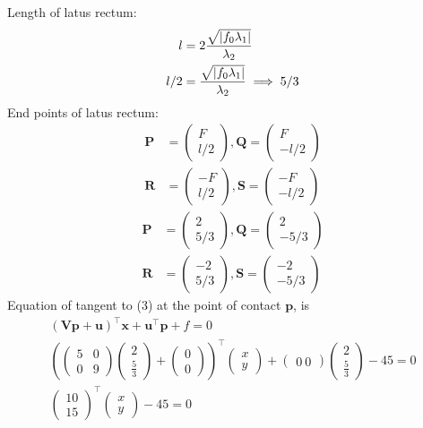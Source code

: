 \documentclass[10pt, a4paper]{article}
\providecommand{\brak}[1]{\ensuremath{\left(#1\right)}}
\newcommand{\myvec}[1]{\ensuremath{\begin{pmatrix}#1\end{pmatrix}}}
\let\vec\mathbf
\begin{document}
	 Length of latus rectum:
	 \begin{align}
	 l&=2\frac{\sqrt{\abs{f_0\lambda_1}}}{\lambda_2}\\
	  l/2&=\frac{\sqrt{\abs{f_0\lambda_1}}}{\lambda_2}\implies 5/3
	  \end{align} 
End points of latus rectum:
\begin{align}
\vec{P}&=\myvec{F\\l/2},\vec{Q}=\myvec{F\\-l/2}\\\vec{R}&=\myvec{-F\\l/2},\vec{S}=\myvec{-F\\-l/2}
\end{align}
\begin{align}
\vec{P}&=\myvec{2\\5/3},\vec{Q}=\myvec{2\\-5/3}\\\vec{R}&=\myvec{-2\\5/3},\vec{S}=\myvec{-2\\-5/3}
\end{align}
%
Equation of tangent to (3) at the point of contact $\vec{p}$, is 
\begin{align}
  \brak{\vec{V}\vec{p}+\vec{u}}^{\top}\vec{x}+\vec{u}^{\top}\vec{p}+f = 0 \\
 \brak{\myvec{5 & 0 \\
		 0 & 9}\myvec{2 \\
		              \frac{5}{3}}+\myvec{0\\0}}^{\top}
		               \myvec{x \\
		                      y}+\myvec{0 \ 0}\myvec{2 \\
		                             \frac{5}{3}}-45=0\\
\myvec{10\\15}^{\top}\myvec{x \\
		                    y}-45=0
\end{align}
\end{document}
